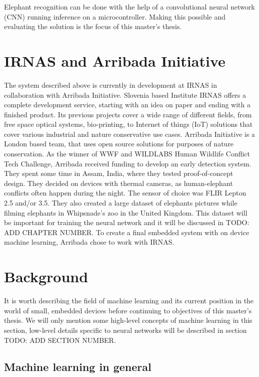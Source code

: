 Elephant recognition can be done with the help of a convolutional neural network (CNN) running inference on a microcontroller. 
Making this possible and evaluating the solution is the focus of this master's thesis.


\section{ IRNAS and Arribada Initiative}

The system described above is currently in development at IRNAS in collaboration with Arribada Initiative.
Slovenia based Institute IRNAS offers a complete development service, starting with an idea on paper and ending with a finished product. 
Its previous projects cover a wide range of different fields, from free space optical systems, bio-printing, to Internet of things (IoT) solutions that cover various industrial and nature conservative use cases.
Arribada Initiative is a London based team, that uses open source solutions for purposes of nature conservation.
As the winner of WWF and WILDLABS Human Wildlife Conflict Tech Challenge\cite{wildlabs-winners}, Arribada received funding to develop an early detection system.
They spent some time in Assam, India, where they tested proof-of-concept design\cite{arribada-assam}.
They decided on devices with thermal cameras, as human-elephant conflicts often happen during the night.
The sensor of choice was FLIR Lepton 2.5 and/or 3.5.
They also created a large dataset of elephants pictures while filming elephants in Whipsnade's zoo in the United Kingdom. 
This dataset will be important for training the neural network and it will be discussed in TODO: ADD CHAPTER NUMBER.
To create a final embedded system with on device machine learning, Arribada chose to work with IRNAS.


\section{ Background}

It is worth describing the field of machine learning and its current position in the world of small, embedded devices before continuing to objectives of this master's thesis.
We will only mention some high-level concepts of machine learning in this section, low-level details specific to neural networks will be described in section TODO: ADD SECTION NUMBER.

\subsection{ Machine learning in general}

